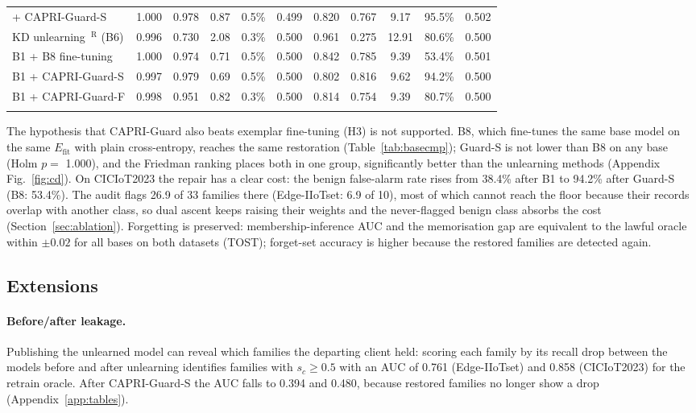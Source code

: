 \documentclass[pdflatex,sn-mathphys-num,iicol]{sn-jnl}
\newcommand{\Efit}{E_{\mathrm{fit}}}
\begin{document}
\begin{table}[t]
\begin{tabular*}{\textwidth}{@{\extracolsep\fill}lcccccccccc@{}}
\quad + CAPRI-Guard-S & 1.000 & 0.978 & 0.87 & 0.5\% & 0.499 & 0.820 & 0.767 & 9.17 & 95.5\% & 0.502 \\
KD unlearning~\cite{wu2022distill}$^{\mathrm{R}}$ (B6) & 0.996 & 0.730 & 2.08 & 0.3\% & 0.500 & 0.961 & 0.275 & 12.91 & 80.6\% & 0.500 \\
B1 + B8 fine-tuning & 1.000 & 0.974 & 0.71 & 0.5\% & 0.500 & 0.842 & 0.785 & 9.39 & 53.4\% & 0.501 \\
B1 + CAPRI-Guard-S & 0.997 & 0.979 & 0.69 & 0.5\% & 0.500 & 0.802 & 0.816 & 9.62 & 94.2\% & 0.500 \\
B1 + CAPRI-Guard-F & 0.998 & 0.951 & 0.82 & 0.3\% & 0.500 & 0.814 & 0.754 & 9.39 & 80.7\% & 0.500 \\
\botrule
\end{tabular*}
\end{table}

The hypothesis that CAPRI-Guard also beats exemplar fine-tuning (H3) is not supported. B8, which fine-tunes the same base model on the same $\Efit$ with plain cross-entropy, reaches the same restoration (Table~\ref{tab:basecmp}); Guard-S is not lower than B8 on any base (Holm $p=$ 1.000), and the Friedman ranking places both in one group, significantly better than the unlearning methods (Appendix Fig.~\ref{fig:cd}). On CICIoT2023 the repair has a clear cost: the benign false-alarm rate rises from 38.4\% after B1 to 94.2\% after Guard-S (B8: 53.4\%). The audit flags 26.9 of 33 families there (Edge-IIoTset: 6.9 of 10), most of which cannot reach the floor because their records overlap with another class, so dual ascent keeps raising their weights and the never-flagged benign class absorbs the cost (Section~\ref{sec:ablation}). Forgetting is preserved: membership-inference AUC and the memorisation gap are equivalent to the lawful oracle within $\pm0.02$ for all bases on both datasets (TOST); forget-set accuracy is higher because the restored families are detected again.





\subsection{Extensions}\label{sec:res-ext}

\paragraph{Before/after leakage.} Publishing the unlearned model can reveal which families the departing client held: scoring each family by its recall drop between the models before and after unlearning identifies families with $s_c\ge0.5$ with an AUC of 0.761 (Edge-IIoTset) and 0.858 (CICIoT2023) for the retrain oracle. After CAPRI-Guard-S the AUC falls to 0.394 and 0.480, because restored families no longer show a drop (Appendix~\ref{app:tables}).
\end{document}
